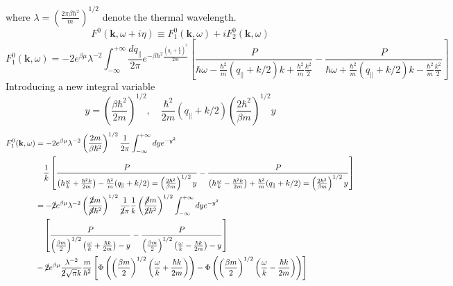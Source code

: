 where $\lambda=\left( \frac{2\pi\beta\hbar^2}{m} \right)^{1/2}$ denote the thermal wavelength.
\begin{equation}
F^0(\mathbf k,\omega+i\eta)\equiv F^0_1(\mathbf k,\omega)+iF^0_2(\mathbf k,\omega)
\end{equation}
\begin{equation}
F^0_1(\mathbf k,\omega)=-2e^{\beta\mu} {\lambda^{-2}} \int_{-\infty}^{+\infty} \frac{d q_\parallel}{2\pi} e^{-\beta\hbar^2 \frac{\left(q_\parallel+\frac{ k}{2}\right)^2}{2m}}
\left[ \frac{P}{\hbar \omega-\frac{\hbar^2}{m} (q_\parallel+ k/2)k+\frac{\hbar^2}{m}\frac{k^2}{2}}-\frac{P}{\hbar \omega+\frac{\hbar^2}{m} (q_\parallel+ k/2)k-\frac{\hbar^2}{m}\frac{k^2}{2}} \right]
\end{equation}
Introducing a new integral variable
\[
y=\left( \frac{\beta\hbar^2}{2m} \right)^{1/2},\quad \frac{\hbar^2}{2m}(q_\parallel+k/2) \left( \frac{2\hbar^2}{\beta m} \right)^{1/2} y
\]
\begin{equation}
\begin{aligned}
F^0_1(\mathbf k,\omega)&=-2e^{\beta\mu} {\lambda^{-2}} \left( \frac{2m}{\beta\hbar^2} \right)^{1/2} \frac{1}{2\pi} \int_{-\infty}^{+\infty} dy e^{-y^2}\\
&\quad \frac{1}{k} \left[ \frac{P}{\left( \hbar \frac{\omega}{k}+\frac{\hbar^2k}{2m} \right)-\frac{\hbar^2}{m}(q_\parallel+k/2)=\left( \frac{2\hbar^2}{\beta m} \right)^{1/2} y}-\frac{P}{\left( \hbar \frac{\omega}{k}-\frac{\hbar^2k}{2m} \right)+\frac{\hbar^2}{m}(q_\parallel+k/2)=\left( \frac{2\hbar^2}{\beta m} \right)^{1/2} y} \right]\\
&=-\cancel{2} e^{\beta\mu} {\lambda^{-2}} \left( \frac{\cancel{2}m}{\cancel{\beta}\hbar^2} \right)^{1/2} \frac{1}{\cancel{2}\pi} \frac{1}{k} \left( \frac{\cancel{\beta} m}{\cancel{2}\hbar^2} \right)^{1/2} \int_{-\infty}^{+\infty} dy e^{-y^2}\\
&\quad \left[ \frac{P}{\left(\frac{\beta m}{2}\right)^{1/2} \left( \frac{\omega}{k}+\frac{\hbar k}{2m} \right)-y}-\frac{P}{\left(\frac{\beta m}{2}\right)^{1/2} \left( \frac{\omega}{k}-\frac{\hbar k}{2m} \right)-y} \right]\\
&-\cancel{2}e^{\beta\mu} \frac{\lambda^{-2}}{\cancel{2}\sqrt \pi k} \frac{m}{\hbar^2} \left[ \Phi \left(\left(\frac{\beta m}{2}\right)^{1/2} \left( \frac{\omega}{k}+\frac{\hbar k}{2m} \right)\right)- \Phi \left(\left(\frac{\beta m}{2}\right)^{1/2} \left( \frac{\omega}{k}-\frac{\hbar k}{2m} \right)\right) \right]
\end{aligned}
\end{equation}
